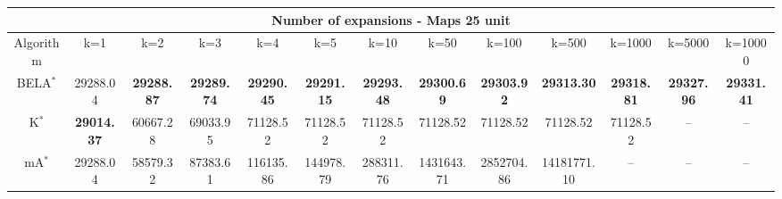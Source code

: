 \begin{tabular}{c|cccccccccccc}\toprule
\multicolumn{13}{c}{Number of expansions - Maps 25 unit}\\ \midrule
Algorithm & k=1 & k=2 & k=3 & k=4 & k=5 & k=10 & k=50 & k=100 & k=500 & k=1000 & k=5000 & k=10000 \\ \midrule
BELA$^*$ & 29288.04 & \textbf{29288.87} & \textbf{29289.74} & \textbf{29290.45} & \textbf{29291.15} & \textbf{29293.48} & \textbf{29300.69} & \textbf{29303.92} & \textbf{29313.30} & \textbf{29318.81} & \textbf{29327.96} & \textbf{29331.41} \\
K$^*$ & \textbf{29014.37} & 60667.28 & 69033.95 & 71128.52 & 71128.52 & 71128.52 & 71128.52 & 71128.52 & 71128.52 & 71128.52 & -- & -- \\
mA$^*$ & 29288.04 & 58579.32 & 87383.61 & 116135.86 & 144978.79 & 288311.76 & 1431643.71 & 2852704.86 & 14181771.10 & -- & -- & -- \\ \bottomrule 
\end{tabular}
